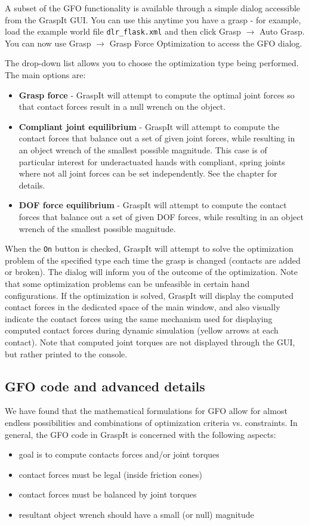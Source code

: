 A subset of the GFO functionality is available through a simple dialog
accessible from the GraspIt GUI. You can use this anytime you have a
grasp - for example, load the example world file
\texttt{dlr\_flask.xml} and then click Grasp $\rightarrow$ Auto
Grasp. You can now use Grasp $\rightarrow$ Grasp Force Optimization to
access the GFO dialog.

The drop-down list allows you to choose the optimization type being
performed. The main options are:
\begin{itemize}
\item \textbf{Grasp force} - GraspIt will attempt to compute the
  optimal joint forces so that contact forces result in a null wrench
  on the object.
\item \textbf{Compliant joint equilibrium} - GraspIt will attempt to
  compute the contact forces that balance out a set of given joint
  forces, while resulting in an object wrench of the smallest possible
  magnitude. This case is of particular interest for underactuated
  hands with compliant, spring joints where not all joint forces can
  be set independently. See the 
  chapter for details.
\item \textbf{DOF force equilibrium} - GraspIt will attempt to compute
  the contact forces that balance out a set of given DOF forces, while
  resulting in an object wrench of the smallest possible magnitude.
\end{itemize}

When the \texttt{On} button is checked, GraspIt will attempt to solve
the optimization problem of the specified type each time the grasp is
changed (contacts are added or broken). The dialog will inform you of
the outcome of the optimization. Note that some optimization problems
can be unfeasible in certain hand configurations. If the optimization
is solved, GraspIt will display the computed contact forces in the
dedicated space of the main window, and also visually indicate the
contact forces using the same mechanism used for displaying computed
contact forces during dynamic simulation (yellow arrows at each
contact). Note that computed joint torques are not displayed through
the GUI, but rather printed to the console.

\subsection{GFO code and advanced details}

We have found that the mathematical formulations for GFO allow for
almost endless possibilities and combinations of optimization criteria
vs. constraints. In general, the GFO code in GraspIt is concerned with
the following aspects:
\begin{itemize}
\item goal is to compute contacts forces and/or joint torques
\item contact forces must be legal (inside friction cones)
\item contact forces must be balanced by joint torques
\item resultant object wrench should have a small (or null) magnitude
\end{itemize}

